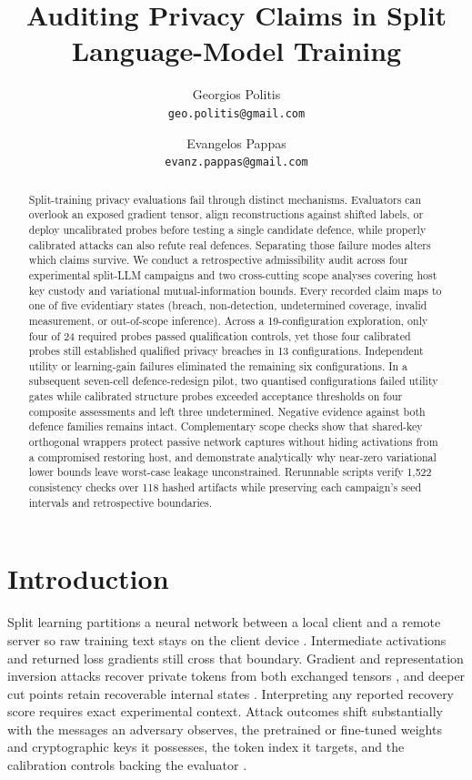 \documentclass[11pt]{article}
\title{\textbf{Auditing Privacy Claims in Split Language-Model Training}}
\author{Georgios Politis\\ {\small\texttt{geo.politis@gmail.com}} \and
Evangelos Pappas\\ {\small\texttt{evanz.pappas@gmail.com}}}
\date{}
\begin{document}
\maketitle
\begin{abstract}
Split-training privacy evaluations fail through distinct mechanisms.
Evaluators can overlook an exposed gradient tensor, align reconstructions
against shifted labels, or deploy uncalibrated probes before testing a
single candidate defence, while properly calibrated attacks can also refute
real defences. Separating those failure modes alters which claims survive.
We conduct a retrospective admissibility audit across four experimental
split-LLM campaigns and two cross-cutting scope analyses covering host key
custody and variational mutual-information bounds. Every recorded claim maps
to one of five evidentiary states (breach, non-detection, undetermined
coverage, invalid measurement, or out-of-scope inference). Across a
19-configuration exploration, only four of 24 required probes passed
qualification controls, yet those four calibrated probes still established
qualified privacy breaches in 13 configurations. Independent utility or
learning-gain failures eliminated the remaining six configurations. In a
subsequent seven-cell defence-redesign pilot, two quantised configurations
failed utility gates while calibrated structure probes exceeded acceptance
thresholds on four composite assessments and left three undetermined.
Negative evidence against both defence families remains intact.
Complementary scope checks show that shared-key orthogonal wrappers protect
passive network captures without hiding activations from a compromised
restoring host, and demonstrate analytically why near-zero variational lower
bounds leave worst-case leakage unconstrained. Rerunnable scripts verify
1,522 consistency checks over 118 hashed artifacts while preserving each
campaign's seed intervals and retrospective boundaries.
\end{abstract}

\section{Introduction}
\label{sec:intro}

Split learning partitions a neural network between a local client and a
remote server so raw training text stays on the client device
\cite{vepakomma2018,splitsurvey2026}. Intermediate activations and returned
loss gradients still cross that boundary. Gradient and representation
inversion attacks recover private tokens from both exchanged tensors
\cite{gisurvey2022,dager2024,fedspy2026}, and deeper cut points retain
recoverable internal states \cite{depth2025,actinv2026,bettisplit2026}.
Interpreting any reported recovery score requires exact experimental
context. Attack outcomes shift substantially with the messages an adversary
observes, the pretrained or fine-tuned weights and cryptographic keys it
possesses, the token index it targets, and the calibration controls backing
the evaluator \cite{ablation2026,adaptive2022,labelbudget2026}.
\end{document}
